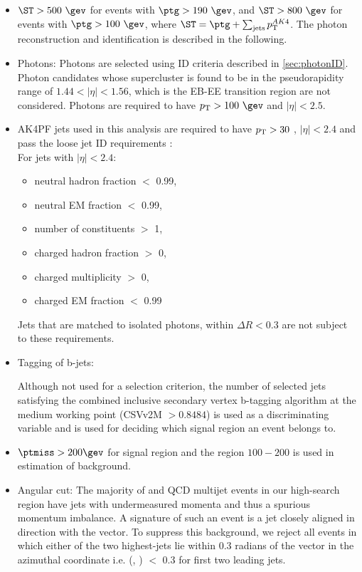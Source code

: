 \begin{itemize}
\item  $\ST>500\ \gev$ for events with $\ptg>190~\gev$,
 and $\ST>800~\gev$ for events with $\ptg>100~\gev$, where $\ST = \ptg+\sum_{\mathrm{jets}} \pt^{AK4}$.
The photon reconstruction and identification is described in the following.

\item Photons: 
Photons are selected using ID criteria described in \ref{sec:photonID}.
Photon candidates whose supercluster
is found to be in the pseudorapidity range of $1.44 < |\eta| < 1.56$, which is the EB-EE 
transition region are not considered.
Photons are required to have $\pt>100~\gev$
and $|\eta|<2.5$.

\item AK4PF jets used in this analysis are required to have $p_{\mathrm{T}}>30$ \gev, $|\eta|<2.4$ and pass the loose jet ID requirements \cite{CMS-PAS-JME-16-003}: \\
  For jets with $|\eta|<2.4$:
  \begin{itemize}
  \item neutral hadron fraction $<$ 0.99,
  \item neutral EM fraction $<$ 0.99,
  \item number of constituents $>$ 1,
  \item charged hadron fraction $>$ 0,
  \item charged multiplicity $>$ 0,
  \item charged EM fraction $<$ 0.99
  \end{itemize}
  Jets that are matched to isolated photons, within $\Delta R<0.3$ are not subject to these requirements.   

\item Tagging of b-jets:

  Although not used for a selection criterion, the number of selected
  jets satisfying the combined inclusive secondary vertex b-tagging algorithm at the medium working
  point (CSVv2M $>0.8484$) is used as a discriminating variable \cite{BTV-16-002} and is used for deciding which signal region an event 
  belongs to.

\item $\ptmiss>200 \gev$ for signal region and the region $100-200$ \gev \ptmiss is used in estimation of \gjets background.
\item Angular cut:
  The majority of \gjets and QCD multijet events in our high-\ptmiss search region
  have jets with undermeasured momenta and thus a spurious
  momentum imbalance.  A signature of such an event is a jet closely
  aligned in direction with the \ptmiss vector.  To suppress this background, we reject
  all events in which either of the two highest-\pt jets lie within 0.3 radians
  of the \ptmiss vector in the azimuthal coordinate i.e. \dphi(\ptvecmiss, \ptvecjet) $<$ 0.3 for first two leading jets.


\end{itemize}
